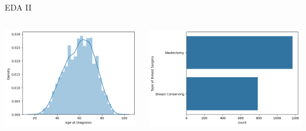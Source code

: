 \documentclass{beamer}
\begin{document}
\begin{frame}{EDA II}
\begin{columns}
    \begin{column}{0.49 \textwidth}
        \centering
        \includegraphics[width = \textwidth]{images/age.png}
    \end{column}
    \begin{column}{0.49 \textwidth}
        \centering
        \includegraphics[width = \textwidth]{images/breast_surgery.png}
    \end{column}
\end{columns}
\end{frame}
\end{document}
